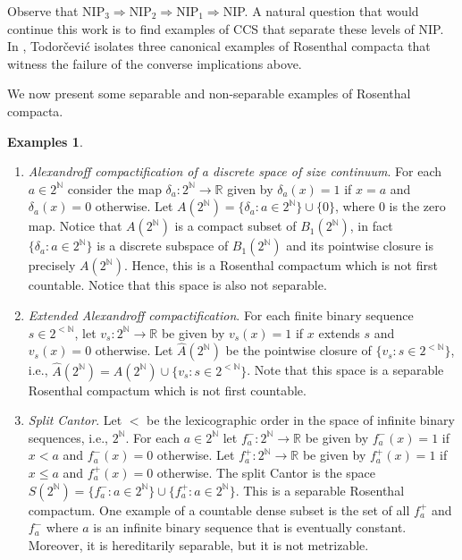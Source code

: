 \documentclass[psamsfonts]{amsart}
\theoremstyle{definition}
\newtheorem{exmps}[thm]{Examples}
\theoremstyle{remark}
\numberwithin{equation}{section}
\begin{document}
Observe that NIP$_3 \Rightarrow $NIP$_2\Rightarrow $NIP$_1\Rightarrow $NIP.
A natural question that would continue this work is to find examples of CCS that separate these levels of NIP.
In \cite{Todorcevic_1999_CompactSubsetsBaire}, Todorčević isolates three canonical examples of Rosenthal compacta that witness the failure of the converse implications above.


We now present some separable and non-separable examples of Rosenthal compacta.

\begin{exmps}
\label{E:Rosenthal comacta}
\hfill
\begin{enumerate}
    \item \emph{Alexandroff compactification of a discrete space of size continuum}.
For each $a\in 2^\mathbb{N}$ consider the map $\delta_a:2^\mathbb{N}\rightarrow\mathbb{R}$ given by $\delta_a(x)=1$ if $x=a$ and $\delta_a(x)=0$ otherwise.
Let $A(2^\mathbb{N})=\{\delta_a:a\in 2^\mathbb{N}\}\cup\{0\}$, where $0$ is the zero map.
Notice that $A(2^\mathbb{N})$ is a compact subset of $B_1(2^\mathbb{N})$, in fact $\{\delta_a:a\in 2^\mathbb{N}\}$ is a discrete subspace of $B_1(2^\mathbb{N})$ and its pointwise closure is precisely $A(2^\mathbb{N})$.
Hence, this is a Rosenthal compactum which is not first countable.
Notice that this space is also not separable.
    \item \emph{Extended Alexandroff compactification}.
For each finite binary sequence $s\in 2^{<\mathbb{N}}$, let $v_s:2^\mathbb{N}\rightarrow\mathbb{R}$ be given by $v_s(x)=1$ if $x$ extends $s$ and $v_s(x)=0$ otherwise.
Let $\hat{A}(2^\mathbb{N})$ be the pointwise closure of $\{v_s:s\in2^{<\mathbb{N}}\}$, i.e., $\hat{A}(2^\mathbb{N})=A(2^\mathbb{N})\cup\{v_s:s\in 2^{<\mathbb{N}}\}$.
Note that this space is a separable Rosenthal compactum which is not first countable.
    \item \emph{Split Cantor}.
Let $<$ be the lexicographic order in the space of infinite binary sequences, i.e., $2^\mathbb{N}$.
For each $a\in 2^\mathbb{N}$ let $f_a^-:2^\mathbb{N}\rightarrow\mathbb{R}$ be given by $f_a^-(x)=1$ if $x<a$ and $f_a^-(x)=0$ otherwise.
Let $f_a^+:2^\mathbb{N}\rightarrow\mathbb{R}$ be given by $f_a^+(x)=1$ if $x\leq a$ and $f_a^+(x)=0$ otherwise.
The split Cantor is the space $S(2^\mathbb{N})=\{f_a^-:a\in 2^\mathbb{N}\}\cup\{f_a^+:a\in 2^\mathbb{N}\}$.
This is a separable Rosenthal compactum.
One example of a countable dense subset is the set of all $f_a^+$ and $f_a^-$ where $a$ is an infinite binary sequence that is eventually constant.
Moreover, it is hereditarily separable, but it is not metrizable.


\end{enumerate}
\end{exmps}
\end{document}
